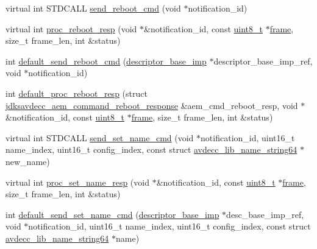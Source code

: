 \begin{DoxyCompactItemize}
\item 
virtual int S\+T\+D\+C\+A\+LL \hyperlink{classavdecc__lib_1_1descriptor__base__imp_a7579db44e8e86da0f8f94aa4680df795}{send\+\_\+reboot\+\_\+cmd} (void $\ast$notification\+\_\+id)
\item 
virtual int \hyperlink{classavdecc__lib_1_1descriptor__base__imp_a8b3de398748e8299daf7296964f73c22}{proc\+\_\+reboot\+\_\+resp} (void $\ast$\&notification\+\_\+id, const \hyperlink{stdint_8h_aba7bc1797add20fe3efdf37ced1182c5}{uint8\+\_\+t} $\ast$\hyperlink{gst__avb__playbin_8c_ac8e710e0b5e994c0545d75d69868c6f0}{frame}, size\+\_\+t frame\+\_\+len, int \&status)
\item 
int \hyperlink{classavdecc__lib_1_1descriptor__base__imp_a14e3bd11c70e839a0594dc59dffcbf16}{default\+\_\+send\+\_\+reboot\+\_\+cmd} (\hyperlink{classavdecc__lib_1_1descriptor__base__imp}{descriptor\+\_\+base\+\_\+imp} $\ast$descriptor\+\_\+base\+\_\+imp\+\_\+ref, void $\ast$notification\+\_\+id)
\item 
int \hyperlink{classavdecc__lib_1_1descriptor__base__imp_a774dc940e9918a60127b0b021582b32a}{default\+\_\+proc\+\_\+reboot\+\_\+resp} (struct \hyperlink{structjdksavdecc__aem__command__reboot__response}{jdksavdecc\+\_\+aem\+\_\+command\+\_\+reboot\+\_\+response} \&aem\+\_\+cmd\+\_\+reboot\+\_\+resp, void $\ast$\&notification\+\_\+id, const \hyperlink{stdint_8h_aba7bc1797add20fe3efdf37ced1182c5}{uint8\+\_\+t} $\ast$\hyperlink{gst__avb__playbin_8c_ac8e710e0b5e994c0545d75d69868c6f0}{frame}, size\+\_\+t frame\+\_\+len, int \&status)
\item 
virtual int S\+T\+D\+C\+A\+LL \hyperlink{classavdecc__lib_1_1descriptor__base__imp_af0bb05af3bf67f2ab0eb522096011592}{send\+\_\+set\+\_\+name\+\_\+cmd} (void $\ast$notification\+\_\+id, uint16\+\_\+t name\+\_\+index, uint16\+\_\+t config\+\_\+index, const struct \hyperlink{structavdecc__lib_1_1avdecc__lib__name__string64}{avdecc\+\_\+lib\+\_\+name\+\_\+string64} $\ast$new\+\_\+name)
\item 
virtual int \hyperlink{classavdecc__lib_1_1descriptor__base__imp_a182c43d9f31980bb74f05956b1323624}{proc\+\_\+set\+\_\+name\+\_\+resp} (void $\ast$\&notification\+\_\+id, const \hyperlink{stdint_8h_aba7bc1797add20fe3efdf37ced1182c5}{uint8\+\_\+t} $\ast$\hyperlink{gst__avb__playbin_8c_ac8e710e0b5e994c0545d75d69868c6f0}{frame}, size\+\_\+t frame\+\_\+len, int \&status)
\item 
int \hyperlink{classavdecc__lib_1_1descriptor__base__imp_aed899a0eaaaa06a02569135f844ffce8}{default\+\_\+send\+\_\+set\+\_\+name\+\_\+cmd} (\hyperlink{classavdecc__lib_1_1descriptor__base__imp}{descriptor\+\_\+base\+\_\+imp} $\ast$desc\+\_\+base\+\_\+imp\+\_\+ref, void $\ast$notification\+\_\+id, uint16\+\_\+t name\+\_\+index, uint16\+\_\+t config\+\_\+index, const struct \hyperlink{structavdecc__lib_1_1avdecc__lib__name__string64}{avdecc\+\_\+lib\+\_\+name\+\_\+string64} $\ast$name)

\end{DoxyCompactItemize}
